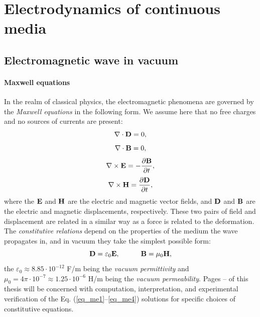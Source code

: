 

\section{Electrodynamics of continuous media} 
\subsection{Electromagnetic wave in vacuum} %
\paragraph{Maxwell equations}  %
In the realm of classical physics, the electromagnetic phenomena are governed by the \textit{Maxwell equations} in the following form.
We assume here that no free charges and no sources of currents are present: 
\begin{equation} \nabla \cdot  \mathbf{D} = 0, \label{eq_me1}\end{equation}  
\begin{equation} \nabla \cdot  \mathbf{B} = 0, \label{eq_me2}\end{equation}  
\begin{equation} \nabla \times \mathbf{E} = -\frac{\partial \mathbf{B}} {\partial t}, \label{eq_me3}\end{equation}  
\begin{equation} \nabla \times \mathbf{H} =  \frac{\partial \mathbf{D}} {\partial t}, \label{eq_me4}\end{equation}  
where the $\mathbf{E}$ and $\mathbf{H}$ are the electric and magnetic vector fields, and $\mathbf{D}$ and $\mathbf{B}$ are the electric and magnetic displacements,
 respectively. These two pairs of field and displacement are related in a similar way as a force is related to the deformation. %
 The \textit{constitutive relations} depend on the properties of the medium the wave propagates in, and in vacuum they take the simplest possible form:
\begin{equation}		\mathbf{D} = \varepsilon_0	\mathbf{E}, \quad\quad\quad						\mathbf{B} = \mu_0			\mathbf{H},				 \label{eq_ce}\end{equation}
the $\varepsilon_0 \approx 8.85\cdot10^{-12}$ F/m being the \textit{vacuum permittivity} and $\mu_0 = 4\pi \cdot 10^{-7} \approx 1.25\cdot10^{-6}$ H/m being the \textit{vacuum permeability}. 
Pages \pageref{starttext}--\pageref{endtext} of this thesis will be concerned with computation, interpretation, and experimental verification of the Eq. (\ref{eq_me1}--\ref{eq_me4}) solutions for specific choices of constitutive equations.
